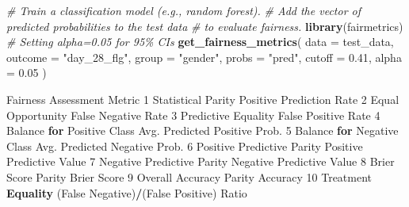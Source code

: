 \documentclass[10pt,a4paper,onecolumn]{article}
\newenvironment{Shaded}{\begin{snugshade}}{\end{snugshade}}
\newcommand{\AttributeTok}[1]{\textcolor[rgb]{0.13,0.29,0.53}{#1}}
\newcommand{\CommentTok}[1]{\textcolor[rgb]{0.56,0.35,0.01}{\textit{#1}}}
\newcommand{\ControlFlowTok}[1]{\textcolor[rgb]{0.13,0.29,0.53}{\textbf{#1}}}
\newcommand{\DecValTok}[1]{\textcolor[rgb]{0.00,0.00,0.81}{#1}}
\newcommand{\FloatTok}[1]{\textcolor[rgb]{0.00,0.00,0.81}{#1}}
\newcommand{\FunctionTok}[1]{\textcolor[rgb]{0.13,0.29,0.53}{\textbf{#1}}}
\newcommand{\NormalTok}[1]{#1}
\newcommand{\SpecialCharTok}[1]{\textcolor[rgb]{0.81,0.36,0.00}{\textbf{#1}}}
\newcommand{\StringTok}[1]{\textcolor[rgb]{0.31,0.60,0.02}{#1}}
\begin{document}
\begin{Shaded}
\begin{Highlighting}[]
\CommentTok{\# Train a classification model (e.g., random forest).}
\CommentTok{\# Add the vector of predicted probabilities to the test data}
\CommentTok{\# to evaluate fairness.}
\FunctionTok{library}\NormalTok{(fairmetrics)}
\CommentTok{\# Setting alpha=0.05 for 95\% CIs}
\FunctionTok{get\_fairness\_metrics}\NormalTok{(}
 \AttributeTok{data =}\NormalTok{ test\_data,}
 \AttributeTok{outcome =} \StringTok{"day\_28\_flg"}\NormalTok{,}
 \AttributeTok{group =} \StringTok{"gender"}\NormalTok{,}
 \AttributeTok{probs =} \StringTok{"pred"}\NormalTok{,}
 \AttributeTok{cutoff =} \FloatTok{0.41}\NormalTok{, }
 \AttributeTok{alpha =} \FloatTok{0.05}
\NormalTok{)}

\NormalTok{           Fairness Assessment                                 Metric}
\DecValTok{1}\NormalTok{          Statistical Parity                Positive Prediction Rate}
\DecValTok{2}\NormalTok{           Equal Opportunity                     False Negative Rate}
\DecValTok{3}\NormalTok{         Predictive Equality                     False Positive Rate}
\DecValTok{4}\NormalTok{  Balance }\ControlFlowTok{for}\NormalTok{ Positive Class           Avg. Predicted Positive Prob.}
\DecValTok{5}\NormalTok{  Balance }\ControlFlowTok{for}\NormalTok{ Negative Class           Avg. Predicted Negative Prob.}
\DecValTok{6}\NormalTok{  Positive Predictive Parity               Positive Predictive Value}
\DecValTok{7}\NormalTok{  Negative Predictive Parity               Negative Predictive Value}
\DecValTok{8}\NormalTok{          Brier Score Parity                             Brier Score}
\DecValTok{9}\NormalTok{     Overall Accuracy Parity                                Accuracy}
\DecValTok{10}\NormalTok{         Treatment }\FunctionTok{Equality}\NormalTok{ (False Negative)}\SpecialCharTok{/}\NormalTok{(False Positive) Ratio}


\end{Highlighting}
\end{Shaded}
\end{document}
